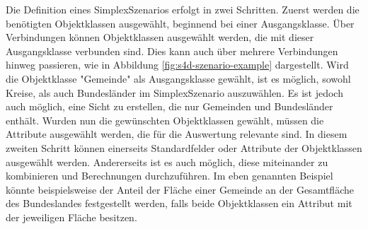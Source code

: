 Die Definition eines SimplexSzenarios erfolgt in zwei Schritten. Zuerst werden die benötigten Objektklassen ausgewählt, beginnend bei einer Ausgangsklasse. Über Verbindungen können Objektklassen ausgewählt werden, die mit dieser Ausgangsklasse verbunden sind. Dies kann auch über mehrere Verbindungen hinweg passieren, wie in Abbildung \ref{fig:s4d-szenario-example} dargestellt. Wird die Objektklasse "Gemeinde" als Ausgangsklasse gewählt, ist es möglich, sowohl Kreise, als auch Bundesländer im SimplexSzenario auszuwählen. Es ist jedoch auch möglich, eine Sicht zu erstellen, die nur Gemeinden und Bundesländer enthält. Wurden nun die gewünschten Objektklassen gewählt, müssen die Attribute ausgewählt werden, die für die Auswertung relevante sind. In diesem zweiten Schritt können einerseits Standardfelder oder Attribute der Objektklassen ausgewählt werden. Andererseits ist es auch möglich, diese miteinander zu kombinieren und Berechnungen durchzuführen. Im eben genannten Beispiel könnte beispielsweise der Anteil der Fläche einer Gemeinde an der Gesamtfläche des Bundeslandes festgestellt werden, falls beide Objektklassen ein Attribut mit der jeweiligen Fläche besitzen.

